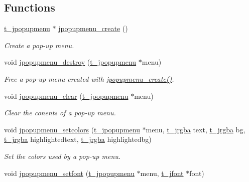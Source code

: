 \subsection*{Functions}
\begin{DoxyCompactItemize}
\item 
\hyperlink{group__jgraphics_ga613e147be2f9655726f08f0896b9dbaa}{t\_\-jpopupmenu} $\ast$ \hyperlink{group__jpopupmenu_ga4ee6ff8775c88750bc002db49bdaa98b}{jpopupmenu\_\-create} ()
\begin{DoxyCompactList}\small\item\em Create a pop-\/up menu. \item\end{DoxyCompactList}\item 
void \hyperlink{group__jpopupmenu_ga1481bf544273533000b02e31e42df65f}{jpopupmenu\_\-destroy} (\hyperlink{group__jgraphics_ga613e147be2f9655726f08f0896b9dbaa}{t\_\-jpopupmenu} $\ast$menu)
\begin{DoxyCompactList}\small\item\em Free a pop-\/up menu created with \hyperlink{group__jpopupmenu_ga4ee6ff8775c88750bc002db49bdaa98b}{jpopupmenu\_\-create()}. \item\end{DoxyCompactList}\item 
void \hyperlink{group__jpopupmenu_gaf4f15c09d15aaaa33d149a6109c4aa47}{jpopupmenu\_\-clear} (\hyperlink{group__jgraphics_ga613e147be2f9655726f08f0896b9dbaa}{t\_\-jpopupmenu} $\ast$menu)
\begin{DoxyCompactList}\small\item\em Clear the conents of a pop-\/up menu. \item\end{DoxyCompactList}\item 
void \hyperlink{group__jpopupmenu_gaef73894f17b579c0cc6cc6d56de4ffe5}{jpopupmenu\_\-setcolors} (\hyperlink{group__jgraphics_ga613e147be2f9655726f08f0896b9dbaa}{t\_\-jpopupmenu} $\ast$menu, \hyperlink{structt__jrgba}{t\_\-jrgba} text, \hyperlink{structt__jrgba}{t\_\-jrgba} bg, \hyperlink{structt__jrgba}{t\_\-jrgba} highlightedtext, \hyperlink{structt__jrgba}{t\_\-jrgba} highlightedbg)
\begin{DoxyCompactList}\small\item\em Set the colors used by a pop-\/up menu. \item\end{DoxyCompactList}\item 
void \hyperlink{group__jpopupmenu_gaf4a1c2ad6943b5095cac1932f9c39972}{jpopupmenu\_\-setfont} (\hyperlink{group__jgraphics_ga613e147be2f9655726f08f0896b9dbaa}{t\_\-jpopupmenu} $\ast$menu, \hyperlink{group__jfont_ga75f83f853e52af957c799723cac89ae5}{t\_\-jfont} $\ast$font)

\end{DoxyCompactItemize}
